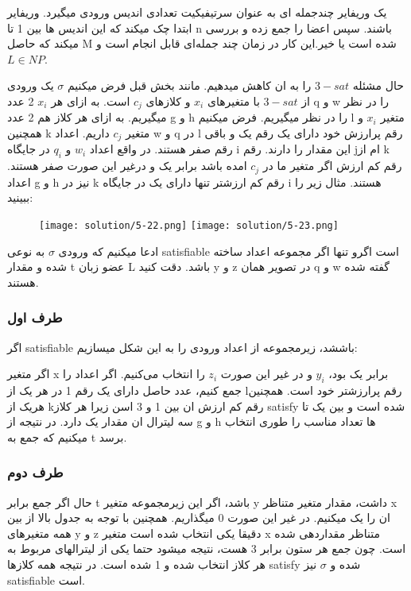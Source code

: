 یک وریفایر چندجمله ای به عنوان سرتیفیکیت تعدادی اندیس ورودی میگیرد.
وریفایر ابتدا چک میکند که این اندیس ها بین 1 تا n باشند.
سپس اعضا را جمع زده و بررسی میکند که حاصل M شده است یا خیر.این کار در زمان چند جمله‌ای قابل انجام است و $L\in NP$.

حال مشئله $3-sat$ را به ان کاهش میدهیم.
مانند بخش قبل فرض میکنیم $\sigma$ یک ورودی از $3-sat$ با متغیرهای
$x_i$ و کلازهای
$c_j$ است.
به ازای هر $x_i$ 
2 عدد q و w را در نظر میگیریم.
به ازای هر کلاز هم 2 عدد
g و h را در نظر میگیریم.
فرض میکنیم l متغیر $x_i$ و همچنین
k متغیر $c_j$ داریم.
اعداد w و q در l رقم پرارزش خود دارای یک رقم یک و باقی رقم صفر هستند.
در واقع اعداد $w_i$ و $q_i$ در جایگاه i این مقدار را دارند.
رقم jام از  k
رقم کم ارزش اگر متغیر ما در $c_j$ امده باشد برابر یک و درغیر این صورت صفر هستند.
اعداد g و h نیز در k رقم کم ارزشتر تنها دارای یک در جایگاه i هستند.
مثال زیر را ببینید:
\begin{figure}[H]
    \centering
    \texttt{[image: solution/5-22.png]}
    \texttt{[image: solution/5-23.png]}
\end{figure}
ادعا میکنیم که ورودی $\sigma$ به نوعی satisfiable است اگرو تنها اگر مجموعه اعداد ساخته شده و مقدار t عضو زبان L باشد. دقت کنید 
y و z  در تصویر همان q و w گفته شده هستند.

\subsubsection*{طرف اول}
اگر satisfiable باششد،
زیرمجموعه از اعداد ورودی را به این شکل میسازیم:

اگر متغیر x برابر یک بود، $y_i$ و در غیر این صورت $z_i$ را انتخاب می‌کنیم.
اگر اعداد را جمع کنیم، عدد حاصل دارای یک رقم 1 در هر یک از lرقم پرارزشتر خود است.
همچنین هریک از kرقم کم ارزش ان بین 1 و 3 اسن زیرا هر کلاز 
satisfy شده است و بین یک تا سه  لیترال ان مقدار یک دارد.
در نتیجه از g و h ها تعداد مناسب را طوری  انتخاب میکنیم که جمع به t برسد.

\subsubsection*{طرف دوم}
حال اگر جمع برابر t باشد،
اگر این زیرمجموعه متغیر y داشت، مقدار متغیر متناظر x ان را یک میکنیم. در غیر این صورت 0 میگذاریم.
همچنین با توجه به جدول بالا از بین همه متغیرهای y و z دقیقا یکی انتخاب شده است متغیر x متناظر مقداردهی شده است.
چون جمع هر ستون برابر 3 هست، نتیجه میشود حتما یکی از لیترالهای مربوط به هر کلاز انتخاب شده و 1 شده است.
در نتیجه همه کلازها satisfy شده و $\sigma$ نیز satisfiable است.

